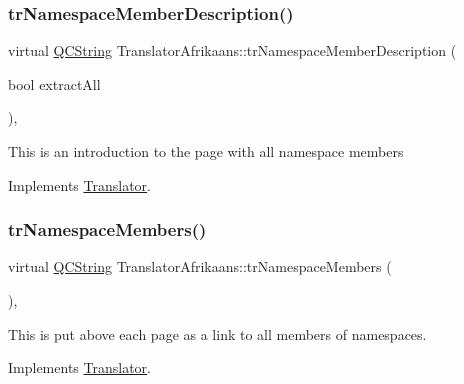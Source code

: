 \mbox{\label{class_translator_afrikaans_a38f71dcffbf8a9413816b6862f2d184e}} 
\subsubsection{\texorpdfstring{trNamespaceMemberDescription()}{trNamespaceMemberDescription()}}
{\footnotesize\ttfamily virtual \mbox{\hyperlink{class_q_c_string}{Q\+C\+String}} Translator\+Afrikaans\+::tr\+Namespace\+Member\+Description (\begin{DoxyParamCaption}\item[{bool}]{extract\+All }\end{DoxyParamCaption})\hspace{0.3cm}{\ttfamily [inline]}, {\ttfamily [virtual]}}

This is an introduction to the page with all namespace members 

Implements \mbox{\hyperlink{class_translator}{Translator}}.

\mbox{\label{class_translator_afrikaans_afd8239b786ea2f665daeac5ab4063608}} 
\subsubsection{\texorpdfstring{trNamespaceMembers()}{trNamespaceMembers()}}
{\footnotesize\ttfamily virtual \mbox{\hyperlink{class_q_c_string}{Q\+C\+String}} Translator\+Afrikaans\+::tr\+Namespace\+Members (\begin{DoxyParamCaption}{ }\end{DoxyParamCaption})\hspace{0.3cm}{\ttfamily [inline]}, {\ttfamily [virtual]}}

This is put above each page as a link to all members of namespaces. 

Implements \mbox{\hyperlink{class_translator}{Translator}}.

\mbox{\label{class_translator_afrikaans_a4570e75b00a7aa70e0ebf064529bbc74}} 

